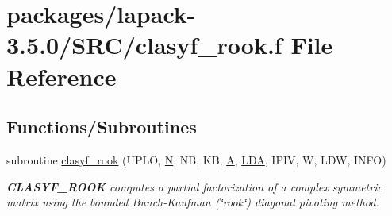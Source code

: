 \hypertarget{clasyf__rook_8f}{}\section{packages/lapack-\/3.5.0/\+S\+R\+C/clasyf\+\_\+rook.f File Reference}
\label{clasyf__rook_8f}
\subsection*{Functions/\+Subroutines}
\begin{DoxyCompactItemize}
\item 
subroutine \hyperlink{group__complexSYcomputational_ga8ab617e2baa9fc9c4728d8cbd1bfde70}{clasyf\+\_\+rook} (U\+P\+L\+O, \hyperlink{polmisc_8c_a0240ac851181b84ac374872dc5434ee4}{N}, N\+B, K\+B, \hyperlink{classA}{A}, \hyperlink{example__user_8c_ae946da542ce0db94dced19b2ecefd1aa}{L\+D\+A}, I\+P\+I\+V, W, L\+D\+W, I\+N\+F\+O)
\begin{DoxyCompactList}\small\item\em {\bfseries C\+L\+A\+S\+Y\+F\+\_\+\+R\+O\+O\+K} computes a partial factorization of a complex symmetric matrix using the bounded Bunch-\/\+Kaufman (\char`\"{}rook\char`\"{}) diagonal pivoting method. \end{DoxyCompactList}\end{DoxyCompactItemize}
